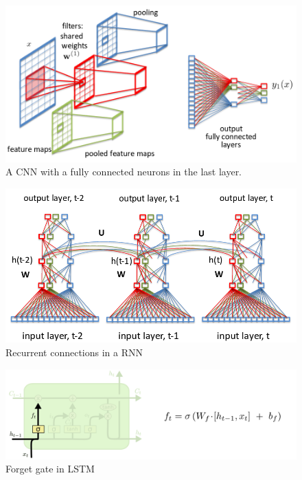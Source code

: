 \documentclass[a4paper]{article}
\begin{document}
\begin{figure}
  \includegraphics[width=.99\linewidth]{img/cnn.png}
  \caption{A CNN with a fully connected neurons in the last layer.}
  \label{fig:cnn}
\end{figure}


\begin{figure}
  \includegraphics[width=.99\linewidth]{img/rnn.png}
  \caption{Recurrent connections in a RNN}
  \label{fig:rnn}
\end{figure}


\begin{figure}
  \includegraphics[width=.99\linewidth]{img/lstm_forget.png}
  \caption{Forget gate in LSTM}
  \label{fig:lstm_forget}
\end{figure}
\end{document}
